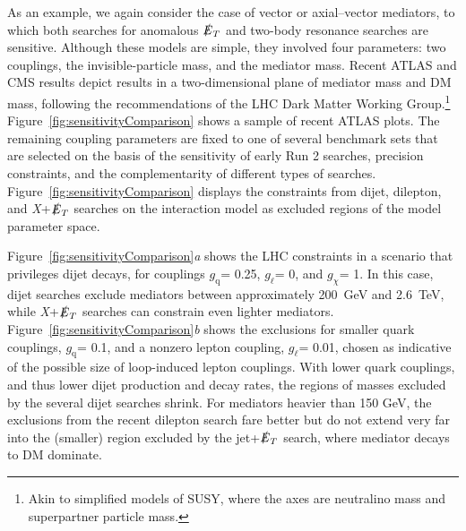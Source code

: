 \documentclass{ar-1col}
\newcommand{\chiDM}{\ensuremath{\chi}\xspace}
\newcommand{\gDM}{\ensuremath{g_{\chiDM}}\xspace}
\newcommand{\gdm}{\gDM}
\newcommand{\gl}{$g_{\ell}$\xspace}
\newcommand{\gq}{$g_{\mathrm{q}}$\xspace}
\newcommand{\MET}{\ensuremath{\slashed{E}_T}\xspace}
\begin{document}
{As an example, we again consider the case of vector or
axial--vector mediators, to which both searches for anomalous \MET and two-body
resonance searches are sensitive. Although these models are simple,
they involved four parameters: two couplings, the invisible-particle
mass, and the mediator mass. Recent ATLAS and CMS results depict
results in a two-dimensional plane of mediator mass and DM
mass, following the recommendations of the LHC Dark Matter Working
Group.\footnote{Akin to simplified models of SUSY, where the axes
are neutralino mass and superpartner particle mass.}
Figure~\ref{fig:sensitivityComparison} shows a sample of
recent ATLAS plots. The remaining coupling parameters are
fixed to one of several benchmark sets that are selected on the basis of the
sensitivity of early Run 2 searches, precision constraints, and
the complementarity of different types of searches. Figure~\ref{fig:sensitivityComparison} displays the
constraints from dijet, dilepton, and \textit{X}+\MET searches on the
interaction model as excluded regions of the model
parameter space.

Figure~\ref{fig:sensitivityComparison}\textit{a} shows the LHC constraints
in a scenario that privileges dijet decays, for couplings
\gq = 0.25, \gl = 0, and \gdm = 1. 
In this case, dijet searches exclude
mediators between approximately 200~GeV and 2.6~TeV, while \textit{X}+\MET searches
can constrain even lighter mediators. 
Figure~\ref{fig:sensitivityComparison}\textit{b} shows the
exclusions for smaller quark couplings, \gq = 0.1, and a nonzero
lepton coupling, \gl = 0.01, chosen as indicative of the possible
size of loop-induced lepton couplings. With lower quark couplings,
and thus lower dijet production and decay rates, the regions of
masses excluded by the several dijet searches shrink. For
mediators heavier than 150 GeV, the exclusions from the recent
dilepton search fare better but do not extend very far into the
(smaller) region excluded by the jet+\MET search, where mediator
decays to DM dominate.

}
\end{document}
